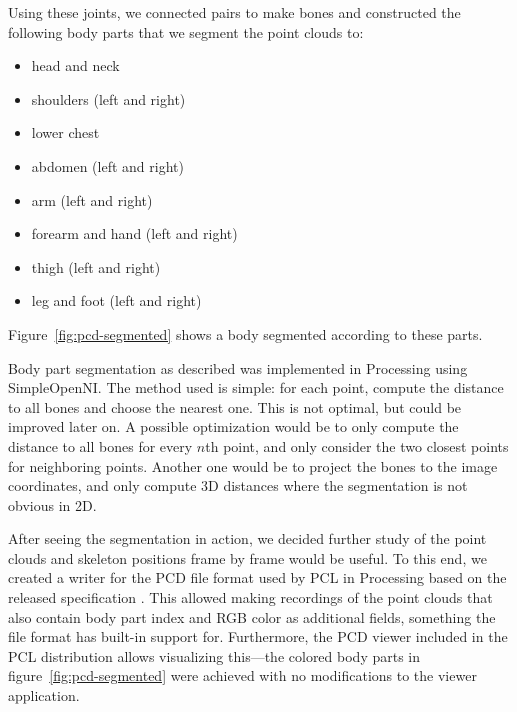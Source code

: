 Using these joints, we connected pairs to make bones and constructed the following body parts that we segment the point clouds to:
%
\begin{itemize}
    \item head and neck
    \item shoulders (left and right)
    \item lower chest
    \item abdomen (left and right)
    \item arm (left and right)
    \item forearm and hand (left and right)
    \item thigh (left and right)
    \item leg and foot (left and right)
\end{itemize}
%
Figure~\ref{fig:pcd-segmented} shows a body segmented according to these parts.

Body part segmentation as described was implemented in Processing using SimpleOpenNI. The method used is simple: for each point, compute the distance to all bones and choose the nearest one. This is not optimal, but could be improved later on. A possible optimization would be to only compute the distance to all bones for every $n$th point, and only consider the two closest points for neighboring points. Another one would be to project the bones to the image coordinates, and only compute 3D distances where the segmentation is not obvious in 2D.

After seeing the segmentation in action, we decided further study of the point clouds and skeleton positions frame by frame would be useful. To this end, we created a writer for the PCD file format used by PCL in Processing based on the released specification \citep{pcdspec}. This allowed making recordings of the point clouds that also contain body part index and RGB color as additional fields, something the file format has built-in support for. Furthermore, the PCD viewer included in the PCL distribution allows visualizing this---the colored body parts in figure~\ref{fig:pcd-segmented} were achieved with no modifications to the viewer application.

